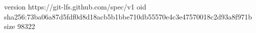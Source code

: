 version https://git-lfs.github.com/spec/v1
oid sha256:73ba06a87d5fdf0d8d18acb5b1bbe710db55570e4c3e47570018c2d93a8f971b
size 98322
